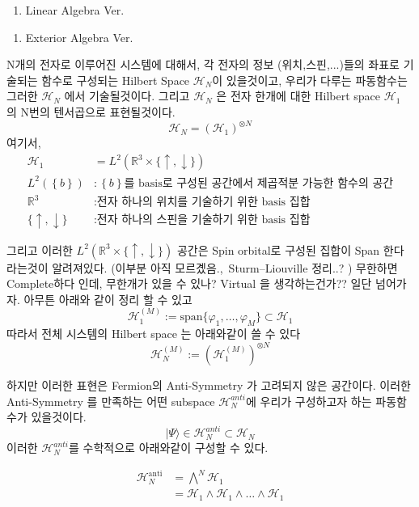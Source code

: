 \documentclass[10pt]{article}
\begin{document}
\begin{enumerate}[label=\(\mathrm{i}\))]
\item {Linear Algebra Ver.}

\end{enumerate}

\begin{enumerate}[label=\(\mathrm{ii}\))]
\item {Exterior Algebra Ver.}

\end{enumerate}



N개의 전자로 이루어진 시스템에 대해서, 각 전자의 정보 (위치,스핀,...)들의 좌표로 기술되는 함수로 구성되는 Hilbert Space \(\mathcal{H}_N\)이 있을것이고, 우리가 다루는 파동함수는 그러한 \(\mathcal{H}_N\) 에서 기술될것이다. 
그리고 \(\mathcal{H}_N\) 은 전자 한개에 대한 Hilbert space \(\mathcal{H}_1\) 의 N번의 텐서곱으로 표현될것이다. 
\[
\mathcal{H}_N = (\mathcal{H}_1)^{\otimes N}
\]
여기서,
\begin{align*}
\mathcal{H}_1 &=  L^2(\mathbb{R}^3 \times \{\uparrow, \downarrow\}) \\
L^2 (\left\{b\right\}) &: \left\{b\right\} \text{를 basis로 구성된 공간에서 제곱적분 가능한 함수의 공간} \\
\mathbb{R}^3 &: \text{전자 하나의 위치를 기술하기 위한 basis 집합}\\
\{\uparrow, \downarrow\} &: \text{전자 하나의 스핀을 기술하기 위한 basis 집합}
\end{align*}

그리고 이러한 \(L^2(\mathbb{R}^3 \times \{\uparrow, \downarrow\})\) 공간은 Spin orbital로 구성된 집합이 Span 한다 라는것이 알려져있다. 
(이부분 아직 모르곘음.,~Sturm–Liouville 정리..? )
무한하면 Complete하다 인데, 무한개가 있을 수 있나? Virtual 을 생각하는건가?? 
일단 넘어가자. 
아무튼 아래와 같이 정리 할 수 있고 
\[
\mathcal{H}_1^{(M)} := \text{span} \{ \varphi_1, \dots, \varphi_M \} \subset \mathcal{H}_1
\]
따라서 전체 시스템의 Hilbert space 는 아래와같이 쓸 수 있다 
\[
\mathcal{H}_N^{(M)} := \left( \mathcal{H}_1^{(M)} \right)^{\otimes N}
\]

하지만 이러한 표현은 Fermion의 Anti-Symmetry 가 고려되지 않은 공간이다. 이러한 Anti-Symmetry 를 만족하는 어떤 subspace \(\mathcal{H}_N^{anti}\)에 우리가 구성하고자 하는 파동함수가 있을것이다. 
\[
\vert \Psi \rangle \in \mathcal{H}_N^{anti} \subset \mathcal{H}_N
\]
이러한 \(\mathcal{H}_N^{anti}\)를 수학적으로 아래와같이 구성할 수 있다. 


\begin{align*}
\mathcal{H}_N^{\text{anti}} &= \bigwedge^N \mathcal{H}_1\\
&= \mathcal{H}_1 \wedge \mathcal{H}_1 \wedge \dots \wedge \mathcal{H}_1
\end{align*}
\end{document}

